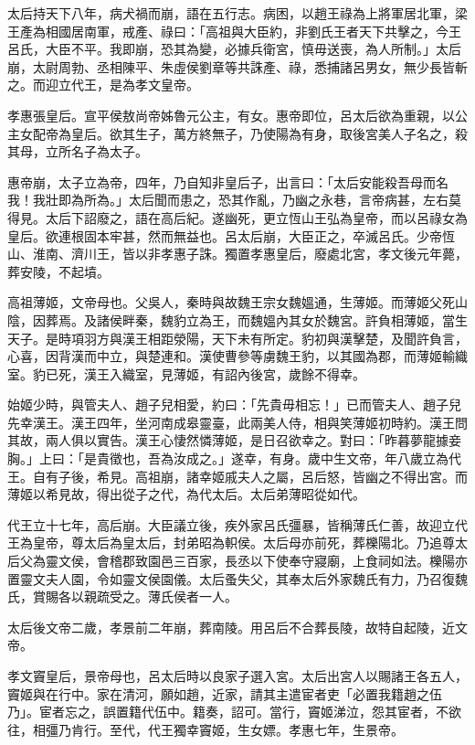 \begin{pinyinscope}
太后持天下八年，病犬禍而崩，語在五行志。病困，以趙王祿為上將軍居北軍，梁王產為相國居南軍，戒產、祿曰：「高祖與大臣約，非劉氏王者天下共擊之，今王呂氏，大臣不平。我即崩，恐其為變，必據兵衛宮，慎毋送喪，為人所制。」太后崩，太尉周勃、丞相陳平、朱虛侯劉章等共誅產、祿，悉捕諸呂男女，無少長皆斬之。而迎立代王，是為孝文皇帝。

孝惠張皇后。宣平侯敖尚帝姊魯元公主，有女。惠帝即位，呂太后欲為重親，以公主女配帝為皇后。欲其生子，萬方終無子，乃使陽為有身，取後宮美人子名之，殺其母，立所名子為太子。

惠帝崩，太子立為帝，四年，乃自知非皇后子，出言曰：「太后安能殺吾母而名我！我壯即為所為。」太后聞而患之，恐其作亂，乃幽之永巷，言帝病甚，左右莫得見。太后下詔廢之，語在高后紀。遂幽死，更立恆山王弘為皇帝，而以呂祿女為皇后。欲連根固本牢甚，然而無益也。呂太后崩，大臣正之，卒滅呂氏。少帝恆山、淮南、濟川王，皆以非孝惠子誅。獨置孝惠皇后，廢處北宮，孝文後元年薨，葬安陵，不起墳。

高祖薄姬，文帝母也。父吳人，秦時與故魏王宗女魏媼通，生薄姬。而薄姬父死山陰，因葬焉。及諸侯畔秦，魏豹立為王，而魏媼內其女於魏宮。許負相薄姬，當生天子。是時項羽方與漢王相距滎陽，天下未有所定。豹初與漢擊楚，及聞許負言，心喜，因背漢而中立，與楚連和。漢使曹參等虜魏王豹，以其國為郡，而薄姬輸織室。豹已死，漢王入織室，見薄姬，有詔內後宮，歲餘不得幸。

始姬少時，與管夫人、趙子兒相愛，約曰：「先貴毋相忘！」已而管夫人、趙子兒先幸漢王。漢王四年，坐河南成皋靈臺，此兩美人侍，相與笑薄姬初時約。漢王問其故，兩人俱以實告。漢王心悽然憐薄姬，是日召欲幸之。對曰：「昨暮夢龍據妾胸。」上曰：「是貴徵也，吾為汝成之。」遂幸，有身。歲中生文帝，年八歲立為代王。自有子後，希見。高祖崩，諸幸姬戚夫人之屬，呂后怒，皆幽之不得出宮。而薄姬以希見故，得出從子之代，為代太后。太后弟薄昭從如代。

代王立十七年，高后崩。大臣議立後，疾外家呂氏彊暴，皆稱薄氏仁善，故迎立代王為皇帝，尊太后為皇太后，封弟昭為軹侯。太后母亦前死，葬櫟陽北。乃追尊太后父為靈文侯，會稽郡致園邑三百家，長丞以下使奉守寢廟，上食祠如法。櫟陽亦置靈文夫人園，令如靈文侯園儀。太后蚤失父，其奉太后外家魏氏有力，乃召復魏氏，賞賜各以親疏受之。薄氏侯者一人。

太后後文帝二歲，孝景前二年崩，葬南陵。用呂后不合葬長陵，故特自起陵，近文帝。

孝文竇皇后，景帝母也，呂太后時以良家子選入宮。太后出宮人以賜諸王各五人，竇姬與在行中。家在清河，願如趙，近家，請其主遣宦者吏「必置我籍趙之伍乃」。宦者忘之，誤置籍代伍中。籍奏，詔可。當行，竇姬涕泣，怨其宦者，不欲往，相彊乃肯行。至代，代王獨幸竇姬，生女嫖。孝惠七年，生景帝。


\end{pinyinscope}
